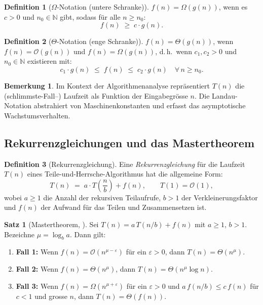 ﻿\documentclass[a4paper,12pt]{article}
\theoremstyle{definition}
\newtheorem{definition}{Definition}
\newtheorem{satz}{Satz}
\newtheorem{bemerkung}{Bemerkung}
\begin{document}
\begin{definition}[$\Omega$-Notation (untere Schranke)]
    $f(n) = \Omega(g(n))$, wenn es $c > 0$ und $n_0 \in \mathbb{N}$ gibt, sodass
    für alle $n \geq n_0$:
    \[
        f(n) \;\geq\; c \cdot g(n).
    \]
\end{definition}

\begin{definition}[$\Theta$-Notation (enge Schranke)]
    $f(n) = \Theta(g(n))$, wenn $f(n) = \mathcal{O}(g(n))$ und
    $f(n) = \Omega(g(n))$, d.\,h.\ wenn $c_1, c_2 > 0$ und $n_0 \in \mathbb{N}$
    existieren mit:
    \[
        c_1 \cdot g(n) \;\leq\; f(n) \;\leq\; c_2 \cdot g(n)
        \quad \forall\, n \geq n_0.
    \]
\end{definition}

\begin{bemerkung}
    Im Kontext der Algorithmenanalyse repräsentiert $T(n)$ die (schlimmste-Fall--)
    Laufzeit als Funktion der Eingabegrösse $n$. Die Landau-Notation abstrahiert
    von Maschinenkonstanten und erfasst das asymptotische Wachstumsverhalten.
\end{bemerkung}

\subsection{Rekurrenzgleichungen und das Mastertheorem}

\begin{definition}[Rekurrenzgleichung]
    Eine \emph{Rekurrenzgleichung} für die Laufzeit $T(n)$ eines
    Teile-und-Herrsche-Algorithmus hat die allgemeine Form:
    \[
        T(n) \;=\; a \cdot T\!\left(\frac{n}{b}\right) + f(n), \qquad T(1) = \mathcal{O}(1),
    \]
    wobei $a \geq 1$ die Anzahl der rekursiven Teilaufrufe, $b > 1$ der
    Verkleinerungsfaktor und $f(n)$ der Aufwand für das Teilen und Zusammensetzen ist.
\end{definition}

\begin{satz}[Mastertheorem, \cite{cormen2009}]
    \label{satz:master}
    Sei $T(n) = a\,T(n/b) + f(n)$ mit $a \geq 1$, $b > 1$.
    Bezeichne $\mu = \log_b a$. Dann gilt:
    \begin{enumerate}
        \item \textbf{Fall 1:} Wenn $f(n) = \mathcal{O}(n^{\mu - \varepsilon})$ für
              ein $\varepsilon > 0$, dann $T(n) = \Theta(n^\mu)$.
        \item \textbf{Fall 2:} Wenn $f(n) = \Theta(n^\mu)$, dann
              $T(n) = \Theta(n^\mu \log n)$.
        \item \textbf{Fall 3:} Wenn $f(n) = \Omega(n^{\mu + \varepsilon})$ für
              ein $\varepsilon > 0$ und $a\,f(n/b) \leq c\,f(n)$ für $c < 1$
              und grosse $n$, dann $T(n) = \Theta(f(n))$.
    \end{enumerate}
\end{satz}
\end{document}
